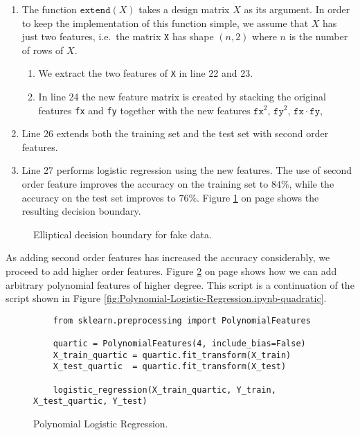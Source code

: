 \begin{enumerate}
\item The function $\texttt{extend}(X)$ takes a design matrix $X$ as its argument.  In order to keep the
      implementation of this function simple, we assume that $X$ has just two features, i.e.~the matrix
      $\texttt{X}$ has shape $(n, 2)$ where $n$ is the number of rows of $X$.
      \begin{enumerate}
      \item We extract the two features of \texttt{X} in line 22 and 23.
      \item In line 24 the new feature matrix is created by stacking the original features \texttt{fx} and
            \texttt{fy} together with the new features $\mathtt{fx}^2$, $\mathtt{fy}^2$, $\mathtt{fx} \cdot \mathtt{fy}$, 
      \end{enumerate}
\item Line 26 extends both the training set and the test set with second order features.
\item Line 27 performs logistic regression using the new features.
      The use of second order feature improves the accuracy on the training set to $84\%$, while the accuracy
      on the test set improves to $76\%$.
      Figure \ref{fig:fake-data-ellipse.pdf} on page \pageref{fig:fake-data-ellipse.pdf} shows the resulting
      decision boundary.
\end{enumerate}


\begin{figure}[!th]
\caption{Elliptical decision boundary for fake data.}
\label{fig:fake-data-ellipse.pdf}
\end{figure}


As adding second order features has increased the accuracy considerably, we proceed to add higher order features.
Figure \ref{fig:Polynomial-Logistic-Regression.ipynb-quartic} on page
\pageref{fig:Polynomial-Logistic-Regression.ipynb-quartic} shows how we can add arbitrary polynomial features
of higher degree.  This script is a continuation of the script shown in Figure \ref{fig:Polynomial-Logistic-Regression.ipynb-quadratic}.

\begin{figure}[!th]
  \centering

\begin{verbatim}
    from sklearn.preprocessing import PolynomialFeatures

    quartic = PolynomialFeatures(4, include_bias=False)
    X_train_quartic = quartic.fit_transform(X_train)
    X_test_quartic  = quartic.fit_transform(X_test)

    logistic_regression(X_train_quartic, Y_train, X_test_quartic, Y_test)
\end{verbatim}

\caption{Polynomial Logistic Regression.}
\label{fig:Polynomial-Logistic-Regression.ipynb-quartic}
\end{figure}

